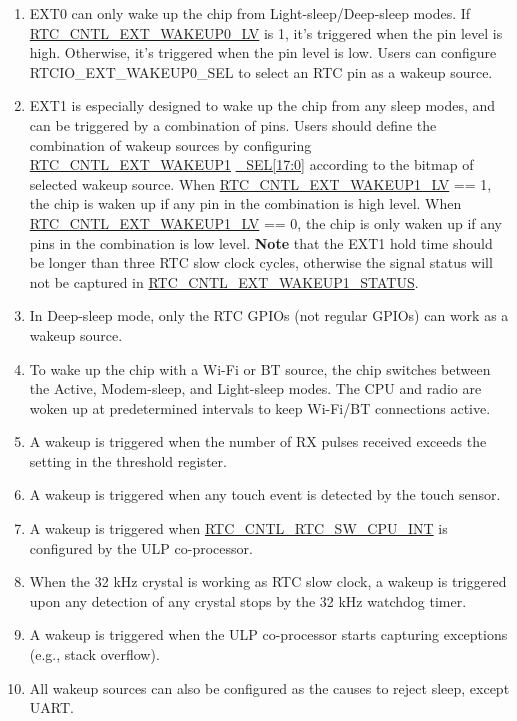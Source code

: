 \documentclass[main\_\_EN.tex]{subfiles}
\begin{document}
\begin{tiplisting}
\vspace{-2em}
\begin{enumerate}
\item \label{wakeup-sources-note1}EXT0 can only wake up the chip from Light-sleep/Deep-sleep modes. If \hyperref[fielddesc:RTCCNTLEXTWAKEUP0LV]{RTC\_CNTL\_EXT\_WAKEUP0\_LV} is 1, it's triggered when the pin level is high. Otherwise, it's triggered when the pin level is low. Users can configure RTCIO\_EXT\_WAKEUP0\_SEL to select an RTC pin as a wakeup source.
\item \label{wakeup-sources-note2}EXT1 is especially designed to wake up the chip from any sleep modes, and can be triggered by a combination of pins. Users should define the combination of wakeup sources by configuring \hyperref[fielddesc:RTCCNTLEXTWAKEUP1SEL]{RTC\_CNTL\_EXT\_WAKEUP1} \hyperref[fielddesc:RTCCNTLEXTWAKEUP1SEL]{\_SEL[17:0]} according to the bitmap of selected wakeup source. When \hyperref[fielddesc:RTCCNTLEXTWAKEUP1LV]{RTC\_CNTL\_EXT\_WAKEUP1\_LV} == 1, the chip is waken up if any pin in the combination is high level. When \hyperref[fielddesc:RTCCNTLEXTWAKEUP1LV]{RTC\_CNTL\_EXT\_WAKEUP1\_LV} == 0, the chip is only waken up if any pins in the combination is low level. {\bfseries Note} that the EXT1 hold time should be longer than three RTC slow clock cycles, otherwise the signal status will not be captured in \hyperref[regdesc:RTCCNTLRTCEXTWAKEUP1STATUSREG]{RTC\_CNTL\_EXT\_WAKEUP1\_STATUS}.
\item \label{wakeup-sources-note3}In Deep-sleep mode, only the RTC GPIOs (not regular GPIOs) can work as a wakeup source.
\item \label{wakeup-sources-note4}To wake up the chip with a Wi-Fi or BT source, the chip switches between the Active, Modem-sleep, and Light-sleep modes. The CPU and radio are woken up at predetermined intervals to keep
Wi-Fi/BT connections active.
\item \label{wakeup-sources-note5}A wakeup is triggered when the number of RX pulses received exceeds the setting in the threshold register.
\item \label{wakeup-sources-note6}A wakeup is triggered when any touch event is detected by the touch sensor.
\item \label{wakeup-sources-note7}A wakeup is triggered when \hyperref[fielddesc:RTCCNTLRTCSWCPUINT]{RTC\_CNTL\_RTC\_SW\_CPU\_INT} is configured by the ULP co-processor.
\item \label{wakeup-sources-note8}When the 32 kHz crystal is working as RTC slow clock, a wakeup is triggered upon any detection of any crystal stops by the 32 kHz watchdog timer.
\item \label{wakeup-sources-note9}A wakeup is triggered when the ULP co-processor starts capturing exceptions (e.g., stack overflow).
\item \label{wakeup-sources-note10}All wakeup sources can also be configured as the causes to reject sleep, except UART.
\end{enumerate}
\end{tiplisting}
\end{document}
